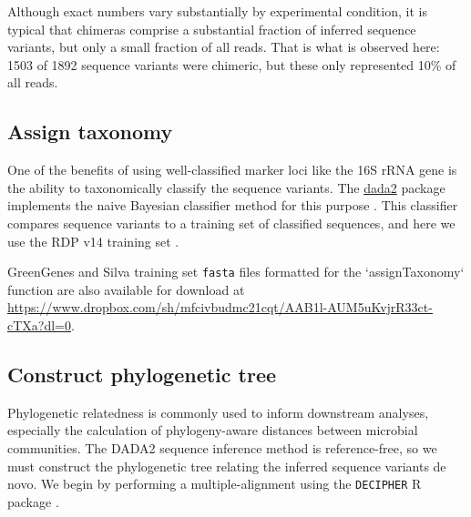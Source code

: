 Although exact numbers vary substantially by experimental condition, it is
typical that chimeras comprise a substantial fraction of inferred sequence variants,
but only a small fraction of all reads. That is
what is observed here: 1503 of 1892 sequence variants were chimeric, but
these only represented 10\% of all reads.

\subsection*{Assign taxonomy}

One of the benefits of using well-classified marker loci like the 16S
rRNA gene is the ability to taxonomically classify the sequence
variants. The \href{http://bioconductor.org/packages/dada2}{dada2}
package implements the naive Bayesian classifier method for this
purpose \cite{wang2007naive}. This classifier compares sequence
variants to a training set of classified sequences, and here we use the
RDP v14 training set \cite{cole2009rdp}.

\begin{knitrout}
\color{fgcolor}\begin{kframe}
\begin{alltt}
 \hlkwb{<-} 
 \hlkwb{<-}   
 \hlkwb{<-} \hlstd{(}\hlstd{,} \hlstd{,} \hlstd{,} \hlstd{,} \hlstd{,} \hlstd{)}
\end{alltt}
\end{kframe}
\end{knitrout}

GreenGenes and Silva training set {\tt fasta} files formatted for the
`assignTaxonomy` function are also available for download at
\url{https://www.dropbox.com/sh/mfcivbudmc21cqt/AAB1l-AUM5uKvjrR33ct-cTXa?dl=0}.

\subsection*{Construct phylogenetic tree}
Phylogenetic relatedness is commonly used to inform downstream
analyses, especially the calculation of phylogeny-aware distances
between microbial communities. The DADA2 sequence inference method is
reference-free, so we must construct the phylogenetic tree relating
the inferred sequence variants de novo. We begin by performing a
multiple-alignment using the {\tt DECIPHER} R package
\cite{wright2015decipher}.

